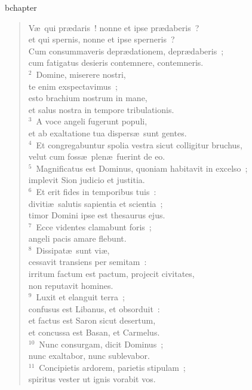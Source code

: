 bchapter\begin{verse}\vspace{-19pt}V\ae\ qui pr\ae daris~! nonne et ipse pr\ae daberis~?\\ et qui spernis, nonne et ipse sperneris~?\\ Cum consummaveris depr\ae dationem, depr\ae daberis~;\\ cum fatigatus desieris contemnere, contemneris.\\
${}^{2}$~Domine, miserere nostri,\\ te enim exspectavimus~;\\ esto brachium nostrum in mane,\\ et salus nostra in tempore tribulationis.\\
${}^{3}$~A voce angeli fugerunt populi,\\ et ab exaltatione tua dispers\ae\ sunt gentes.\\
${}^{4}$~Et congregabuntur spolia vestra sicut colligitur bruchus,\\ velut cum foss\ae\ plen\ae\ fuerint de eo.\\
${}^{5}$~Magnificatus est Dominus, quoniam habitavit in excelso~;\\ implevit Sion judicio et justitia.\\
${}^{6}$~Et erit fides in temporibus tuis~:\\ diviti\ae\ salutis sapientia et scientia~;\\ timor Domini ipse est thesaurus ejus.\\
${}^{7}$~Ecce videntes clamabunt foris~;\\ angeli pacis amare flebunt.\\
${}^{8}$~Dissipat\ae\ sunt vi\ae ,\\ cessavit transiens per semitam~:\\ irritum factum est pactum, projecit civitates,\\ non reputavit homines.\\
${}^{9}$~Luxit et elanguit terra~;\\ confusus est Libanus, et obsorduit~:\\ et factus est Saron sicut desertum,\\ et concussa est Basan, et Carmelus.\\
${}^{10}$~Nunc consurgam, dicit Dominus~;\\ nunc exaltabor, nunc sublevabor.\\
${}^{11}$~Concipietis ardorem, parietis stipulam~;\\ spiritus vester ut ignis vorabit vos.\\

\end{verse}
